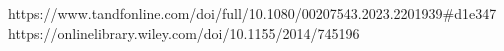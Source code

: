 https://www.tandfonline.com/doi/full/10.1080/00207543.2023.2201939#d1e347
https://onlinelibrary.wiley.com/doi/10.1155/2014/745196